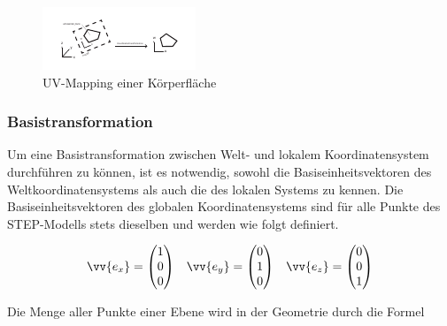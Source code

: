 \begin{figure}[h]
	\centering
	
	\includegraphics[width=0.7\linewidth]{img/uvwmapping.pdf}
	
	\caption{UV-Mapping einer Körperfläche}
	\label{fig:uvwmapping}
	
\end{figure}
 
\subsubsection{Basistransformation}
\label{sec:basetransform}


Um eine Basistransformation zwischen Welt- und lokalem Koordinatensystem durchführen zu können, ist es notwendig, sowohl die Basiseinheitsvektoren des Weltkoordinatensystems als auch die des lokalen Systems zu kennen. Die Basiseinheitsvektoren des globalen Koordinatensystems sind für alle Punkte des STEP-Modells stets dieselben und werden wie folgt definiert.

\begin{singlespace}
	\begin{equation}
	\begin{aligned}
	\vv{e_{x}}=\begin{pmatrix}
	1 \\ 
	0 \\ 
	0
	\end{pmatrix}  
	&& 
	\vv{e_{y}}=\begin{pmatrix}
	0 \\ 
	1 \\ 
	0
	\end{pmatrix}  
	&& 
	\vv{e_{z}}=\begin{pmatrix}
	0 \\ 
	0 \\ 
	1
	\end{pmatrix} 
	\end{aligned}
	\end{equation}
\end{singlespace}

Die Menge aller Punkte einer Ebene wird in der Geometrie durch die Formel

